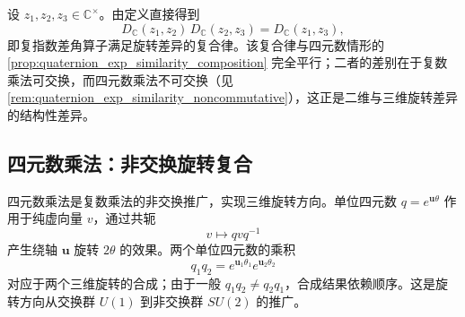\begin{remark}[复指数差角算子的复合律]\label{rem:complex_exp_similarity_composition}
设 $z_1,z_2,z_3\in\mathbb C^\times$。由定义直接得到
\[
D_{\mathbb C}(z_1,z_2)\,D_{\mathbb C}(z_2,z_3)=D_{\mathbb C}(z_1,z_3),
\]
即复指数差角算子满足旋转差异的复合律。该复合律与四元数情形的 \cref{prop:quaternion_exp_similarity_composition} 完全平行；二者的差别在于复数乘法可交换，而四元数乘法不可交换（见 \cref{rem:quaternion_exp_similarity_noncommutative}），这正是二维与三维旋转差异的结构性差异。
\end{remark}

\subsection{四元数乘法：非交换旋转复合}

\begin{proposition}\label{prop:quaternion_multiplication}
四元数乘法是复数乘法的非交换推广，实现三维旋转方向。单位四元数 $q=e^{\mathbf u\theta}$ 作用于纯虚向量 $v$，通过共轭
\[
v\longmapsto qvq^{-1}
\]
产生绕轴 $\mathbf u$ 旋转 $2\theta$ 的效果。两个单位四元数的乘积
\[
q_1q_2=e^{\mathbf u_1\theta_1}e^{\mathbf u_2\theta_2}
\]
对应于两个三维旋转的合成；由于一般 $q_1q_2\neq q_2q_1$，合成结果依赖顺序。这是旋转方向从交换群 $U(1)$ 到非交换群 $SU(2)$ 的推广。
\end{proposition}

